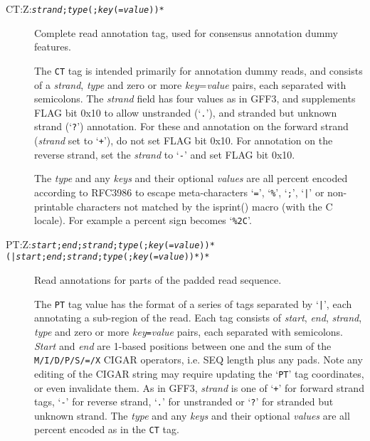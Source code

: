 \documentclass[10pt]{article}
\newcommand{\tagregex}[1]{\tt #1}
\begin{document}
\begin{description}
\item[CT:Z:\tagregex{\emph{strand};\emph{type}(;\emph{key}(=\emph{value}))*}]
Complete read annotation tag, used for consensus annotation dummy features.

The {\tt CT} tag is intended primarily for annotation
dummy reads, and consists of a \emph{strand}, \emph{type} and zero or
more \emph{key}=\emph{value} pairs, each separated with semicolons.
The \emph{strand} field has four values as in GFF3, and supplements FLAG
bit 0x10 to allow unstranded (`{\tt .}'), and stranded but unknown strand
(`{\tt ?}') annotation. For these and annotation on the forward strand
(\emph{strand} set to `{\tt +}'), do not set FLAG bit 0x10. For
annotation on the reverse strand, set the \emph{strand} to `{\tt -}'
and set FLAG bit 0x10.

The \emph{type} and any \emph{keys} and their
optional \emph{values} are all percent encoded according to
RFC3986 to escape meta-characters `{\tt =}', `{\tt \%}', `{\tt ;}',
`{\tt |}' or non-printable characters not matched by the isprint()
macro (with the C locale). For example a percent sign becomes
`{\tt \%2C}'.

\item[PT:Z:\tagregex{\tt \emph{start};\emph{end};\emph{strand};\emph{type}(;\emph{key}(=\emph{value}))*(\char92|\emph{start};\emph{end};\emph{strand};\emph{type}(;\emph{key}(=\emph{value}))*)*}]
Read annotations for parts of the padded read sequence.

The {\tt PT} tag value has the format of a series of
tags separated by `{\tt |}', each annotating a sub-region of the read.
Each tag consists of \emph{start}, \emph{end}, \emph{strand},
\emph{type} and zero or more \emph{key}{\tt =}\emph{value} pairs, each
separated with semicolons. \emph{Start} and \emph{end} are 1-based
positions between one and the sum of the {\tt M/I/D/P/S/=/X}
{\sf CIGAR} operators, i.e. {\sf SEQ} length plus any pads.  Note
any editing of the CIGAR string may require updating the `{\tt PT}'
tag coordinates, or even invalidate them.
As in GFF3, \emph{strand} is one of `{\tt +}' for forward strand tags,
`{\tt -}' for reverse strand, `{\tt .}' for unstranded or `{\tt ?}'
for stranded but unknown strand.
The \emph{type} and any \emph{keys} and their optional \emph{values}
are all percent encoded as in the {\tt CT} tag.
\end{description}
\end{document}
